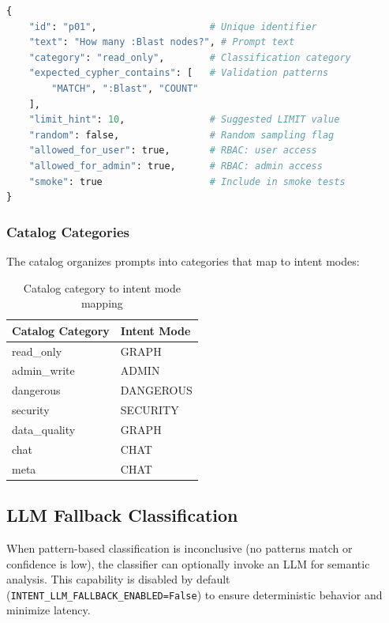 \documentclass[a4paper,twoside]{sapthesis}
\begin{document}
\begin{lstlisting}[language=Python, caption={Prompt catalog entry structure}, label=lst:catalog-entry]
{
    "id": "p01",                    # Unique identifier
    "text": "How many :Blast nodes?", # Prompt text
    "category": "read_only",        # Classification category
    "expected_cypher_contains": [   # Validation patterns
        "MATCH", ":Blast", "COUNT"
    ],
    "limit_hint": 10,               # Suggested LIMIT value
    "random": false,                # Random sampling flag
    "allowed_for_user": true,       # RBAC: user access
    "allowed_for_admin": true,      # RBAC: admin access
    "smoke": true                   # Include in smoke tests
}
\end{lstlisting}

\subsubsection{Catalog Categories}

The catalog organizes prompts into categories that map to intent modes:

\begin{table}[htbp]
\centering
\caption{Catalog category to intent mode mapping}
\label{tab:category-mapping}
\begin{tabular}{ll}
\hline
\textbf{Catalog Category} & \textbf{Intent Mode} \\
\midrule
read\_only & GRAPH \\
admin\_write & ADMIN \\
dangerous & DANGEROUS \\
security & SECURITY \\
data\_quality & GRAPH \\
chat & CHAT \\
meta & CHAT \\
\midrule
\end{tabular}
\end{table}

\subsection{LLM Fallback Classification}

When pattern-based classification is inconclusive (no patterns match or confidence is low), the classifier can optionally invoke an LLM for semantic analysis. This capability is disabled by default (\texttt{INTENT\_LLM\_FALLBACK\_ENABLED=False}) to ensure deterministic behavior and minimize latency.
\end{document}
